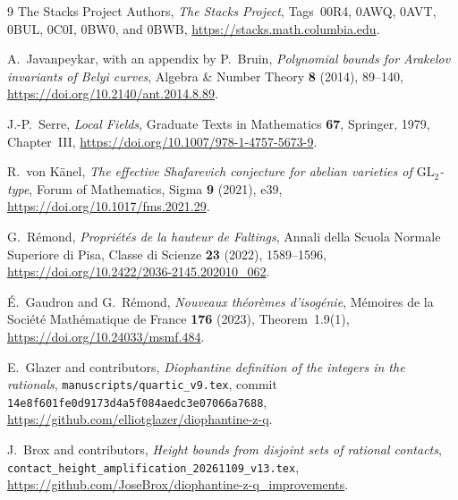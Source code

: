\documentclass[11pt,a4paper]{article}
\theoremstyle{definition}
\begin{document}
\begin{thebibliography}{9}
The Stacks Project Authors, \emph{The Stacks Project},
Tags~00R4, 0AWQ, 0AVT, 0BUL, 0C0I, 0BW0, and 0BWB,
\url{https://stacks.math.columbia.edu}.

A.~Javanpeykar, with an appendix by P.~Bruin,
\emph{Polynomial bounds for Arakelov invariants of Belyi curves},
Algebra \& Number Theory \textbf{8} (2014), 89--140,
\url{https://doi.org/10.2140/ant.2014.8.89}.

J.-P.~Serre, \emph{Local Fields}, Graduate Texts in Mathematics
\textbf{67}, Springer, 1979, Chapter~III,
\url{https://doi.org/10.1007/978-1-4757-5673-9}.

R.~von K\"anel, \emph{The effective Shafarevich conjecture for abelian
varieties of $\mathrm{GL}_2$-type}, Forum of Mathematics, Sigma
\textbf{9} (2021), e39,
\url{https://doi.org/10.1017/fms.2021.29}.

G.~R\'emond, \emph{Propri\'et\'es de la hauteur de Faltings},
Annali della Scuola Normale Superiore di Pisa, Classe di Scienze
\textbf{23} (2022), 1589--1596,
\url{https://doi.org/10.2422/2036-2145.202010_062}.

\'E.~Gaudron and G.~R\'emond,
\emph{Nouveaux th\'eor\`emes d'isog\'enie},
M\'emoires de la Soci\'et\'e Math\'ematique de France
\textbf{176} (2023), Theorem~1.9(1),
\url{https://doi.org/10.24033/msmf.484}.

E.~Glazer and contributors,
\emph{Diophantine definition of the integers in the rationals},
\texttt{manuscripts/quartic\_v9.tex}, commit
\texttt{14e8f601fe0d9173d4a5f084aedc3e07066a7688},
\url{https://github.com/elliotglazer/diophantine-z-q}.

J.~Brox and contributors,
\emph{Height bounds from disjoint sets of rational contacts},
\texttt{contact\_height\_amplification\_20261109\_v13.tex},
\url{https://github.com/JoseBrox/diophantine-z-q_improvements}.
\end{thebibliography}
\end{document}
